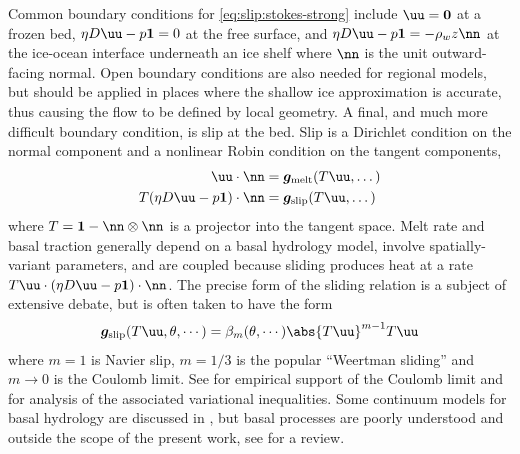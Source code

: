 Common boundary conditions for \eqref{eq:slip:stokes-strong} include $\uu = \bm 0$ at a frozen bed, $\eta D\uu - p\bm 1 = 0$ at the free surface, and $\eta D\uu - p\bm 1 = -\rho_w z \nn$ at the ice-ocean interface underneath an ice shelf where $\nn$ is the unit outward-facing normal.
Open boundary conditions are also needed for regional models, but should be applied in places where the shallow ice approximation is accurate, thus causing the flow to be defined by local geometry.
A final, and much more difficult boundary condition, is slip at the bed.
Slip is a Dirichlet condition on the normal component and a nonlinear Robin condition on the tangent components,
\begin{align}\label{eq:slip:bcstrong}
  \uu\cdot\nn &= \bm g_{\text{melt}}(T\uu,\dotsc) \\
  T (\eta D\uu - p\bm 1)\cdot\nn &= \bm g_{\text{slip}}(T \uu,\dotsc)
\end{align}
where $T = \bm 1 - \nn\otimes\nn$ is a projector into the tangent space.
Melt rate and basal traction generally depend on a basal hydrology model, involve spatially-variant parameters, and are coupled because sliding produces heat at a rate $T\uu\cdot(\eta D\uu - p\bm 1)\cdot\nn$.
The precise form of the sliding relation is a subject of extensive debate, but is often taken to have the form
\begin{gather*}
  \bm g_{\text{slip}}(T\uu,\theta,\cdots) = \beta_m(\theta,\cdots) \abs{T\uu}^{m-1} T\uu
\end{gather*}
where $m=1$ is Navier slip, $m=1/3$ is the popular ``Weertman sliding'' \cite{weertman1957sliding} and $m\to 0$ is the Coulomb limit.
See \cite{iverson1998ring} for empirical support of the Coulomb limit and \cite{schoof2006variational,schoof2006plastic,schoof2007isg} for analysis of the associated variational inequalities.
Some continuum models for basal hydrology are discussed in \cite{flowers2002multicomponent1,flowers2002multicomponent1,johnson2002nhg}, but basal processes are poorly understood and outside the scope of the present work, see \cite{clarke2004subglacial} for a review.

